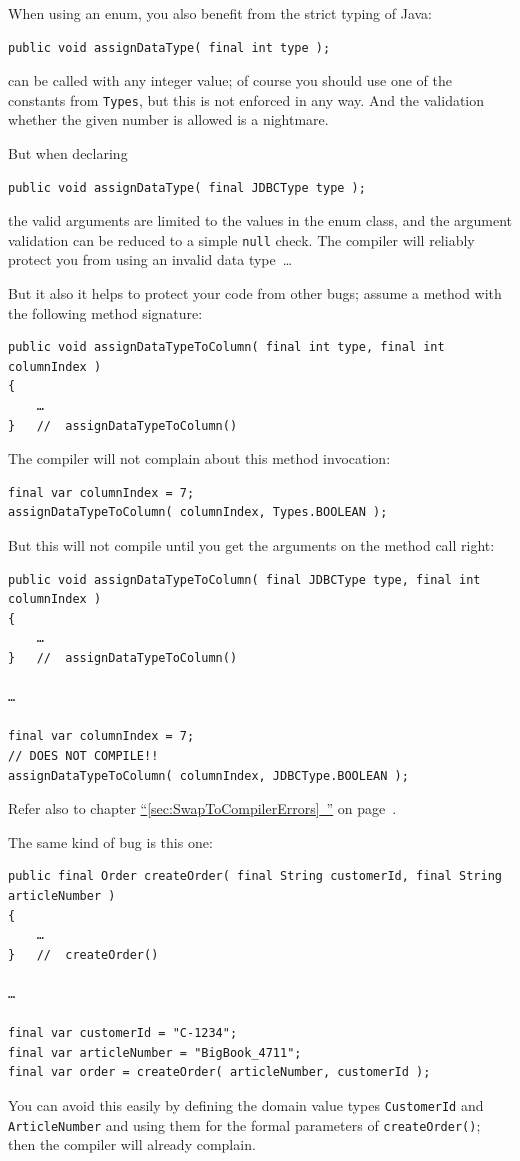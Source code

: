 \documentclass[11pt,a4paper, titlepage, parskip=half, headsepline, footsepline, cleardoublepage=current, headheight=1cm]{scrbook}
\newcommand*{\tqfullvref}[1]{\hyperref[{#1}]{“\ref*{#1}~\nameref*{#1}”} on page~\pageref{#1}}
\begin{document}
When using an enum, you also benefit from the strict typing of Java:
\begin{lstlisting}
public void assignDataType( final int type );
\end{lstlisting}
can be called with any integer value; of course you should use one of the constants from \lstinline|Types|, but this is not enforced in any way. And the validation whether the given number is allowed is a nightmare.

But when declaring
\begin{lstlisting}
public void assignDataType( final JDBCType type );
\end{lstlisting}
the valid arguments are limited to the values in the enum class, and the argument validation can be reduced to a simple \lstinline|null| check. The compiler will reliably protect you from using an invalid data type~…

But it also it helps to protect your code from other bugs; assume a method with the following method signature:
\begin{lstlisting}
public void assignDataTypeToColumn( final int type, final int columnIndex )
{
    …
}	//	assignDataTypeToColumn()
\end{lstlisting}

The compiler will not complain about this method invocation:
\begin{lstlisting}
final var columnIndex = 7;
assignDataTypeToColumn( columnIndex, Types.BOOLEAN );
\end{lstlisting}

But this will not compile until you get the arguments on the method call right:
\begin{lstlisting}
public void assignDataTypeToColumn( final JDBCType type, final int columnIndex )
{
    …
}   //  assignDataTypeToColumn()

…

final var columnIndex = 7;
// DOES NOT COMPILE!!
assignDataTypeToColumn( columnIndex, JDBCType.BOOLEAN );
\end{lstlisting}
Refer also to chapter \tqfullvref{sec:SwapToCompilerErrors}.

The same kind of bug is this one:
\begin{lstlisting}
public final Order createOrder( final String customerId, final String articleNumber )
{
    …
}   //  createOrder()

…

final var customerId = "C-1234";
final var articleNumber = "BigBook_4711";
final var order = createOrder( articleNumber, customerId );
\end{lstlisting}
You can avoid this easily by defining the domain value types \lstinline|CustomerId| and \lstinline|ArticleNumber| and using them for the formal parameters of \lstinline|createOrder()|; then the compiler will already complain.
\end{document}

